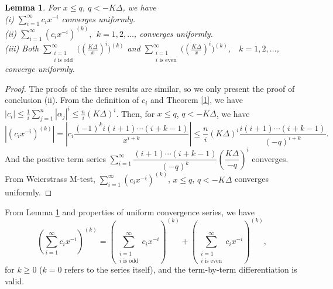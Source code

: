 \documentclass[12pt]{article}
\newtheorem{lemma}[theorem]{Lemma}
\theoremstyle{definition}
\begin{document}
\begin{lemma}\label{se} For $x\leq q$, $q<-K\Delta$, we have
\\(i) $\sum\limits_{i=1}^\infty c_i x^{-i}$ converges uniformly.
\\(ii) $\sum\limits_{i=1}^\infty (c_i x^{-i})^{(k)}, ~~k=1,2,\ldots$, converges uniformly.
\\(iii) Both $\sum\limits_{\substack{ i =1\\ \text{$i$ is odd}}}^\infty \big((\frac{K\Delta}{x})^{i}\big)^{(k)}$ and $\sum\limits_{\substack{ i =1\\ \text{$i$ is even}}}^\infty \big((\frac{K\Delta}{x})^{i}\big)^{(k)}$,~~$k=1,2,\ldots$,  converge uniformly.
\end{lemma}

\begin{proof} The proofs of the three results are similar, so we only present the proof of conclusion (ii).
From the definition of $c_i$ and Theorem \ref{1}, we have
\(
|c_i| \leq \frac{1}{i} \sum\limits_{j=1}^n |\alpha_j|^i \leq \frac{n}{i}(K\Delta)^i
\).
Then, for $x\leq q$, $q<-K\Delta$, we have \begin{equation*}\label{e1}|(c_i x^{-i})^{(k)}|=|c_i \dfrac{(-1)^k i(i+1)\cdots(i+k-1)}{x^{i+k}}|\leq \dfrac{n}{i} (K\Delta)^i\dfrac{i(i+1)\cdots(i+k-1)}{(-q)^{i+k}}.\end{equation*}
And the positive term series $\sum\limits_{ i =1}^\infty \dfrac{(i+1)\cdots(i+k-1)}{(-q)^{k}}(\dfrac{K\Delta}{-q})^{i}$ converges.
From Weierstrass M-test, $\sum\limits_{i=1}^\infty (c_i x^{-i})^{(k)}$, $x\leq q$, $q<-K\Delta$ converges uniformly.
\end{proof}

From Lemma \ref{se} and properties of uniform convergence series, we have
\begin{equation}\label{e2}(\sum\limits_{i=1}^\infty c_i x^{-i})^{(k)}=(\sum\limits_{\substack{ i =1\\ \text{$i$ is odd}}}^\infty c_i x^{-i})^{(k)}+(\sum\limits_{\substack{ i =1\\ \text{$i$ is even}}}^\infty c_i x^{-i})^{(k)},\end{equation}
for $k\geq 0$ ($k=0$ refers to the series itself), and the term-by-term  differentiation is valid.
\end{document}
